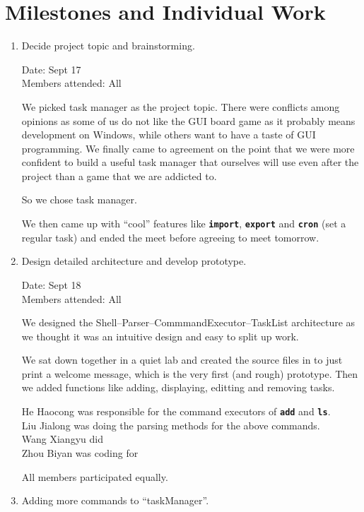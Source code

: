 \documentclass[12pt, a4paper]{article}
\newcommand{\cmdinline}[1]{{\bf \texttt{#1}}}
\begin{document}
\newpage
\section{Milestones and Individual Work}
\begin{enumerate}
\item Decide project topic and brainstorming.

Date: Sept 17 \footnotemark\\
Members attended: All

We picked task manager as the project topic. There were conflicts among opinions as some of us do not like the GUI board game as it probably means development on Windows, while others want to have a taste of GUI programming. We finally came to agreement on the point that we were more confident to build a useful task manager that ourselves will use even after the project than a game that we are addicted to.

So we chose task manager.

We then came up with ``cool'' features like \cmdinline{import}, \cmdinline{export} and \cmdinline{cron} (set a regular task) and ended the meet before agreeing to meet tomorrow.

\item Design detailed architecture and develop prototype.

Date: Sept 18\\
Members attended: All

We designed the Shell--Parser--CommmandExecutor--TaskList architecture as we thought it was an intuitive design and easy to split up work.

We sat down together in a quiet lab and created the source files in to just print a welcome message, which is the very first (and rough) prototype. Then we added functions like adding, displaying, editting and removing tasks.

He Haocong was responsible for the command executors of \cmdinline{add} and \cmdinline{ls}.\\
Liu Jialong was doing the parsing methods for the above commands.\\
Wang Xiangyu did \\
Zhou Biyan was coding for 

All members participated equally.

\item Adding more commands to ``taskManager''.


\end{enumerate}
\end{document}
